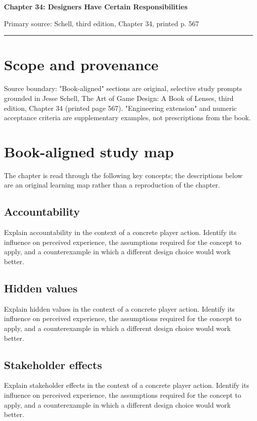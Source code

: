 \documentclass[11pt]{article}
\begin{document}
{\huge\bfseries\color{suiteblue} Chapter 34: Designers Have Certain Responsibilities}\par
\vspace{0.15in}
{\normalsize\color{suitegray} Primary source: Schell, third edition, Chapter 34, printed p. 567}\par
\vspace{0.15in}\hrule\vspace{0.15in}

\section{Scope and provenance}
Source boundary: "Book-aligned" sections are original, selective study prompts grounded in Jesse Schell, The Art of Game Design: A Book of Lenses, third edition, Chapter 34 (printed page 567). "Engineering extension" and numeric acceptance criteria are supplementary examples, not prescriptions from the book.


\section{Book-aligned study map}
The chapter is read through the following key concepts; the descriptions below are an original learning map rather than a reproduction of the chapter.


\subsection{Accountability}
Explain accountability in the context of a concrete player action. Identify its influence on perceived experience, the assumptions required for the concept to apply, and a counterexample in which a different design choice would work better.


\subsection{Hidden values}
Explain hidden values in the context of a concrete player action. Identify its influence on perceived experience, the assumptions required for the concept to apply, and a counterexample in which a different design choice would work better.


\subsection{Stakeholder effects}
Explain stakeholder effects in the context of a concrete player action. Identify its influence on perceived experience, the assumptions required for the concept to apply, and a counterexample in which a different design choice would work better.
\end{document}
